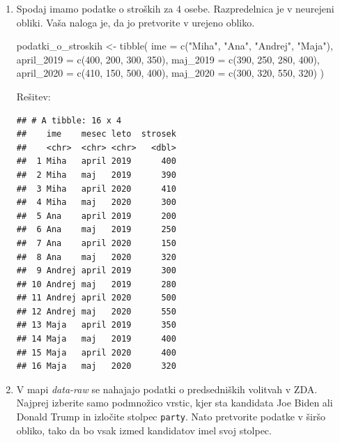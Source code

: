 \documentclass[
]{book}
\newenvironment{Shaded}{\begin{snugshade}}{\end{snugshade}}
\newcommand{\AttributeTok}[1]{\textcolor[rgb]{0.77,0.63,0.00}{#1}}
\newcommand{\DecValTok}[1]{\textcolor[rgb]{0.00,0.00,0.81}{#1}}
\newcommand{\FunctionTok}[1]{\textcolor[rgb]{0.00,0.00,0.00}{#1}}
\newcommand{\NormalTok}[1]{#1}
\newcommand{\OtherTok}[1]{\textcolor[rgb]{0.56,0.35,0.01}{#1}}
\newcommand{\StringTok}[1]{\textcolor[rgb]{0.31,0.60,0.02}{#1}}
\begin{document}
\begin{enumerate}
\def\labelenumi{\arabic{enumi})}
\item
  Spodaj imamo podatke o stroških za 4 osebe. Razpredelnica je v neurejeni obliki. Vaša naloga je, da jo pretvorite v urejeno obliko.

\begin{Shaded}
\begin{Highlighting}[]
\NormalTok{podatki\_o\_stroskih }\OtherTok{\textless{}{-}} \FunctionTok{tibble}\NormalTok{(}
  \AttributeTok{ime =} \FunctionTok{c}\NormalTok{(}\StringTok{"Miha"}\NormalTok{, }\StringTok{"Ana"}\NormalTok{, }\StringTok{"Andrej"}\NormalTok{, }\StringTok{"Maja"}\NormalTok{),}
  \AttributeTok{april\_2019 =} \FunctionTok{c}\NormalTok{(}\DecValTok{400}\NormalTok{, }\DecValTok{200}\NormalTok{, }\DecValTok{300}\NormalTok{, }\DecValTok{350}\NormalTok{),}
  \AttributeTok{maj\_2019 =} \FunctionTok{c}\NormalTok{(}\DecValTok{390}\NormalTok{, }\DecValTok{250}\NormalTok{, }\DecValTok{280}\NormalTok{, }\DecValTok{400}\NormalTok{),}
  \AttributeTok{april\_2020 =} \FunctionTok{c}\NormalTok{(}\DecValTok{410}\NormalTok{, }\DecValTok{150}\NormalTok{, }\DecValTok{500}\NormalTok{, }\DecValTok{400}\NormalTok{),}
  \AttributeTok{maj\_2020 =} \FunctionTok{c}\NormalTok{(}\DecValTok{300}\NormalTok{, }\DecValTok{320}\NormalTok{, }\DecValTok{550}\NormalTok{, }\DecValTok{320}\NormalTok{)}
\NormalTok{)}
\end{Highlighting}
\end{Shaded}

  Rešitev:

\begin{verbatim}
## # A tibble: 16 x 4
##    ime    mesec leto  strosek
##    <chr>  <chr> <chr>   <dbl>
##  1 Miha   april 2019      400
##  2 Miha   maj   2019      390
##  3 Miha   april 2020      410
##  4 Miha   maj   2020      300
##  5 Ana    april 2019      200
##  6 Ana    maj   2019      250
##  7 Ana    april 2020      150
##  8 Ana    maj   2020      320
##  9 Andrej april 2019      300
## 10 Andrej maj   2019      280
## 11 Andrej april 2020      500
## 12 Andrej maj   2020      550
## 13 Maja   april 2019      350
## 14 Maja   maj   2019      400
## 15 Maja   april 2020      400
## 16 Maja   maj   2020      320
\end{verbatim}
\item
  V mapi \emph{data-raw} se nahajajo podatki o predsedniških volitvah v ZDA. Najprej izberite samo podmnožico vrstic, kjer sta kandidata Joe Biden ali Donald Trump in izločite stolpec \texttt{party}. Nato pretvorite podatke v širšo obliko, tako da bo vsak izmed kandidatov imel svoj stolpec.


\end{enumerate}
\end{document}
